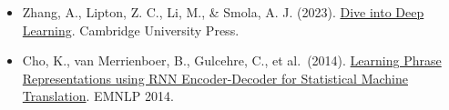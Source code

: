 \vspace{0.25em}
\begin{itemize}
\tightlist
\item
  Zhang, A., Lipton, Z. C., Li, M., \& Smola, A. J. (2023). \href{https://D2L.ai}{Dive into Deep Learning}. Cambridge University Press.
\item
  Cho, K., van Merrienboer, B., Gulcehre, C., et al.~(2014). \href{https://arxiv.org/abs/1406.1078}{Learning Phrase Representations using RNN Encoder-Decoder for Statistical Machine Translation}. EMNLP 2014.
\end{itemize}

\clearpage
